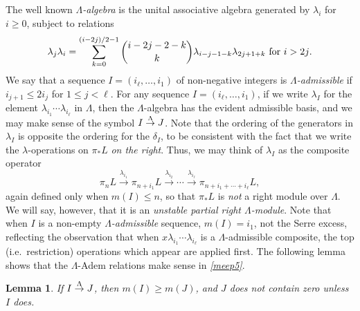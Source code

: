 \documentclass[11pt]{amsart} \renewcommand{\baselinestretch}{1.2}
\theoremstyle{plain}
\newtheorem{lem}[thm]{Lemma}
\numberwithin{equation}{section} %
\theoremstyle{plain}
\newtheorem{lem}[thm]{Lemma}
\numberwithin{equation}{chapter} %
\renewcommand{\to}{\longrightarrow}
\newcommand{\minDimDelta}{m}
\newcommand{\produces}[3]{#3:#1\sim #2}
\renewcommand{\produces}[3]{#1\rightarrow_{#3} #2}%
\renewcommand{\produces}[3]{#1\overset{\smash{#3}}{\rightarrow} #2}%
\begin{document}
\begin{Constructing homotopy operations}
The well known \emph{$\Lambda$-algebra} is the unital associative algebra generated by $\lambda_i$ for $i\geq0$, subject to relations \[\lambda_j\lambda_i=\sum_{k=0}^{(i-2j)/2-1}\binom{i-2j-2-k}{ k}\lambda_{i-j-1-k}\lambda_{2j+1+k}\textup{\ for $i>2j$.}\]
We say that a sequence $I=(i_\ell,\ldots,i_1)$ of non-negative integers is \emph{$\Lambda$-admissible} if $i_{j+1}\leq 2i_j$ for $1\leq j <\ell$. 
For any sequence $I=(i_\ell,\ldots,i_1)$, if we write $\lambda_I$ for the element $\lambda_{i_1}\cdots \lambda_{i_\ell}$ in $\Lambda$, then the $\Lambda$-algebra has the evident admissible basis, and we may make sense of the symbol $\produces{I}{J}{\Lambda}$. Note that the ordering of the generators in $\lambda_I$ is  opposite the ordering for the $\delta_I$, to be consistent with the fact that we write the $\lambda$-operations on $\pi_*L$ \emph{on the right}. Thus, we may think of $\lambda_I$ as the composite operator  
\[\pi_{n}L\overset{\lambda_{i_1}}{\to}\pi_{n+i_1}L\overset{\lambda_{i_2}}{\to}\cdots \overset{\lambda_{i_\ell}}{\to}\pi_{n+i_1+\cdots +i_\ell}L,\]
again defined only when $\minDimDelta(I)\leq n$, so that $\pi_*L$ is \emph{not} a right module over $\Lambda$. We will say, however, that it is an \emph{unstable partial right $\Lambda$-module}.
Note that when $I$ is a non-empty \emph{$\Lambda$-admissible} sequence,
$\minDimDelta(I)=i_1$, not the Serre excess, reflecting the observation that when $x\lambda_{i_1}\cdots \lambda_{i_\ell}$ is a $\Lambda$-admissible composite, the top (i.e.\ restriction) operations which appear are applied first.
The following lemma shows that the $\Lambda$-Adem relations make sense in \emph{\ref{meep5}}.
\begin{lem}
\label{lemOnAdemChangeInMLambdaPlain}
If $\produces{I}{J}{\Lambda}$, then $\minDimDelta(I)\geq\minDimDelta(J)$, and $J$ does not contain zero unless $I$ does.

\end{lem}
\end{Constructing homotopy operations}
\end{document}
